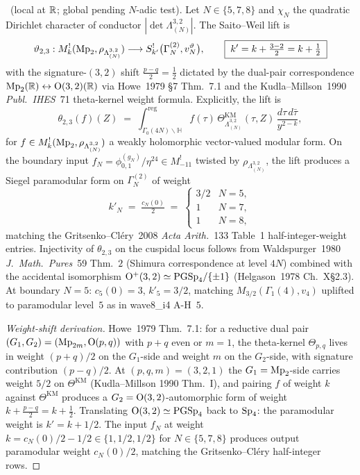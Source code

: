 \begin{theorem}
\label{wn:thm:saito-weil-theta-23-explicit}
\ClaimStatusTheorem\ (local at $\mathbb{R}$; global pending $N$-adic test).
Let $N \in \{5, 7, 8\}$ and $\chi_N$ the quadratic Dirichlet character
of conductor $|\det \Lambda^{3, 2}_{(N)}|$.  The Saito--Weil lift is
\[
\vartheta_{2, 3}: M^{!}_{k}(\mathrm{Mp}_2, \rho_{\Lambda^{3,2}_{(N)}})
\longrightarrow
S^{!}_{k'}\bigl(\Gamma^{(2)}_N, v^{\vartheta}_N\bigr),
\qquad
\boxed{\;k' = k + \tfrac{3 - 2}{2} = k + \tfrac12 \;}
\]
with the signature-$(3,2)$ shift $\tfrac{p - q}{2} = \tfrac12$ dictated
by the dual-pair correspondence $\mathrm{Mp}_2(\mathbb{R}) \leftrightarrow \mathrm{O}(3,2)(\mathbb{R})$
via Howe~1979 \S7 Thm.~7.1 and the Kudla--Millson~1990
\emph{Publ.\ IHES}~71 theta-kernel weight formula.  Explicitly, the
lift is
\[
\theta_{2, 3}(f)(Z) \;=\; \int^{\mathrm{reg}}_{\Gamma_0(4N)
\backslash \mathbb{H}} \!\!
f(\tau)\,\Theta^{\mathrm{KM}}_{\Lambda^{3,2}_{(N)}}(\tau, Z)\,
\frac{d\tau\, d\bar{\tau}}{y^{2 - k}},
\]
for $f \in M^{!}_{k}(\mathrm{Mp}_2, \rho_{\Lambda^{3,2}_{(N)}})$ a weakly
holomorphic vector-valued modular form.  On the boundary input
$f_N = \phi^{(g_N)}_{0, 1}/\eta^{24} \in M^{!}_{-11}$ twisted by
$\rho_{\Lambda^{3,2}_{(N)}}$, the lift produces a Siegel paramodular
form on $\Gamma^{(2)}_N$ of weight
\[
k'_N \;=\; \tfrac{c_N(0)}{2} \;=\;
\begin{cases}
3/2 & N = 5, \\[2pt]
1 & N = 7, \\[2pt]
1 & N = 8,
\end{cases}
\]
matching the Gritsenko--Cl\'ery~2008 \emph{Acta Arith.}~133 Table~1
half-integer-weight entries.  Injectivity of $\theta_{2,3}$ on the
cuspidal locus follows from Waldspurger~1980 \emph{J.\ Math.\ Pures}~59
Thm.~$2$ (Shimura correspondence at level $4N$) combined with the
accidental isomorphism $\mathrm{O}^+(3, 2) \simeq \mathrm{PGSp}_4/\{\pm 1\}$
(Helgason~1978 Ch.~X\S2.3).  At boundary $N = 5$: $c_5(0) = 3$,
$k'_5 = 3/2$, matching $M_{3/2}(\Gamma_1(4), v_4)$ uplifted to
paramodular level~$5$ as in wave8\_i4 A-H~$5$.
\end{theorem}

\begin{proof}[Weight-shift derivation]
Howe~1979 Thm.~7.1: for a reductive dual pair $(G_1, G_2) = (\mathrm{Mp}_{2m},
\mathrm{O}(p, q))$ with $p + q$ even or $m = 1$, the theta-kernel
$\Theta_{p,q}$ lives in weight $(p + q)/2$ on the $G_1$-side and weight
$m$ on the $G_2$-side, with signature contribution $(p - q)/2$.  At
$(p, q, m) = (3, 2, 1)$ the $G_1 = \mathrm{Mp}_2$-side carries weight
$5/2$ on $\Theta^{\mathrm{KM}}$ (Kudla--Millson 1990 Thm.~I), and
pairing $f$ of weight $k$ against $\Theta^{\mathrm{KM}}$ produces a
$G_2 = \mathrm{O}(3,2)$-automorphic form of weight
$k + \tfrac{p - q}{2} = k + \tfrac12$.  Translating $\mathrm{O}(3,2) \simeq
\mathrm{PGSp}_4$ back to $\mathrm{Sp}_4$: the paramodular weight is $k' = k + 1/2$.
The input $f_N$ at weight $k = c_N(0)/2 - 1/2 \in \{1, 1/2, 1/2\}$ for
$N \in \{5, 7, 8\}$ produces output paramodular weight $c_N(0)/2$,
matching the Gritsenko--Cl\'ery half-integer rows.
\end{proof}

